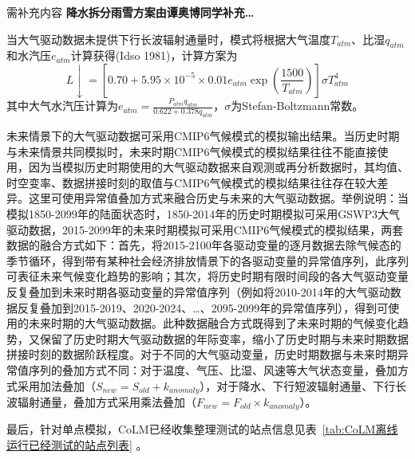 \begin{mymdframed}{需补充内容}
\textbf{\color{red}降水拆分雨雪方案由谭奥博同学补充…}
\end{mymdframed}

当大气驱动数据未提供下行长波辐射通量时，模式将根据大气温度$T_{atm}$、比湿$q_{atm}$和水汽压$e_{atm}$计算获得(Idso 1981)，计算方案为
\begin{equation}\label{L_downarrow}
L \downarrow=\left[0.70+5.95 \times 10^{-5} \times 0.01 e_{a t m} \exp \left(\frac{1500}{T_{a t m}}\right)\right] \sigma T_{a t m}^{4}
\end{equation}
其中大气水汽压计算为$e_{a t m}=\frac{P_{a t m} q_{a t m}}{0.622+0.378 q_{a t m}}$，$\sigma$为Stefan-Boltzmann常数。

未来情景下的大气驱动数据可采用CMIP6气候模式的模拟输出结果。当历史时期与未来情景共同模拟时，未来时期CMIP6气候模式的模拟结果往往不能直接使用，因为当模拟历史时期使用的大气驱动数据来自观测或再分析数据时，其均值、时空变率、数据拼接时刻的取值与CMIP6气候模式的模拟结果往往存在较大差异。这里可使用异常值叠加方式来融合历史与未来的大气驱动数据。举例说明：当模拟1850-2099年的陆面状态时，1850-2014年的历史时期模拟可采用GSWP3大气驱动数据，2015-2099年的未来时期模拟可采用CMIP6气候模式的模拟结果，两套数据的融合方式如下：首先，将2015-2100年各驱动变量的逐月数据去除气候态的季节循环，得到带有某种社会经济排放情景下的各驱动变量的异常值序列，此序列可表征未来气候变化趋势的影响；其次，将历史时期有限时间段的各大气驱动变量反复叠加到未来时期各驱动变量的异常值序列（例如将2010-2014年的大气驱动数据反复叠加到2015-2019、2020-2024、…、2095-2099年的异常值序列），得到可使用的未来时期的大气驱动数据。此种数据融合方式既得到了未来时期的气候变化趋势，又保留了历史时期大气驱动数据的年际变率，缩小了历史时期与未来时期数据拼接时刻的数据阶跃程度。对于不同的大气驱动变量，历史时期数据与未来时期异常值序列的叠加方式不同：对于温度、气压、比湿、风速等大气状态变量，叠加方式采用加法叠加（$S_{new}=S_{old}+k_{anomaly}$），对于降水、下行短波辐射通量、下行长波辐射通量，叠加方式采用乘法叠加（$F_{new}=F_{old}\times k_{anomaly}$）。


最后，针对单点模拟，CoLM已经收集整理测试的站点信息见表~\ref{tab:CoLM离线运行已经测试的站点列表} 。

